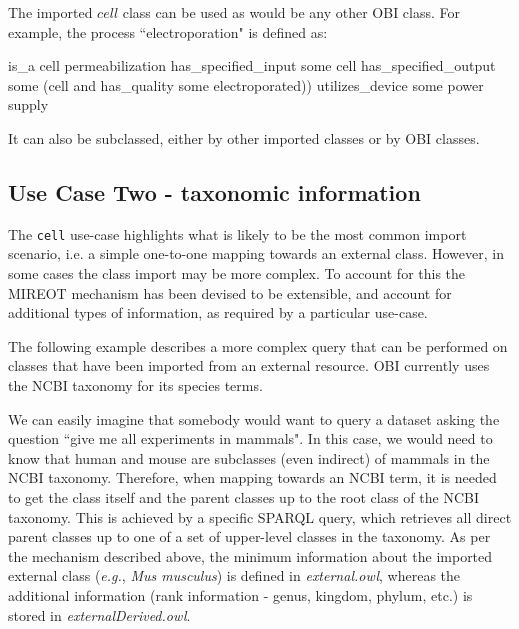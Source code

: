 \documentclass[a4paper,10pt,twocolumn]{article}
\begin{document}


The imported $cell$ class can be used as would be any other OBI class. For example, the process ``electroporation" is defined as:

\begin{footnotesize}
\begin{verbatimtab}
is_a cell permeabilization
has_specified_input some cell
has_specified_output some 
   (cell and has_quality some electroporated))
utilizes_device some power supply
\end{verbatimtab}
\end{footnotesize}

It can also be subclassed, either by other imported classes or by OBI classes.


\subsection*{Use Case Two - taxonomic information}

The \texttt{cell} use-case highlights what is likely to be the most common import scenario, i.e. a simple one-to-one mapping towards an external class. 
However, in some cases the class import may be more complex. To account for this the MIREOT mechanism has been devised to be extensible, and account for additional types of information, as required by a particular use-case.

The following example describes a more complex query that can be performed on classes that have been imported from an external resource. 
OBI currently uses the NCBI taxonomy for its species terms.



We can easily imagine that somebody would want to query a dataset asking the question ``give me all experiments in mammals".
In this case, we would need to know that human and mouse are subclasses (even indirect) of mammals in the NCBI taxonomy.
Therefore, when mapping towards an NCBI term, it is needed to get the class itself and the parent classes up to the root class of the NCBI taxonomy.
This is achieved by a specific SPARQL query, which retrieves all direct parent classes up to one of a set of upper-level classes in the taxonomy.%
As per the mechanism described above, the minimum information about the imported external class (\emph{e.g.}, \emph{Mus musculus}) is defined in \emph{external.owl}, whereas the additional information (rank information - genus, kingdom, phylum, etc.) is stored in \emph{ externalDerived.owl}. 
\end{document}

